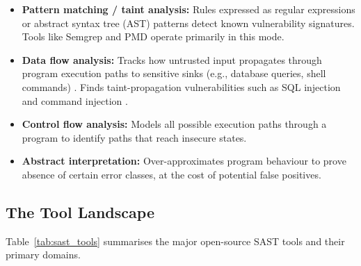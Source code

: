 \begin{itemize}
  \item \textbf{Pattern matching / taint analysis:} Rules expressed as regular expressions or abstract syntax tree (AST) patterns detect known vulnerability signatures. Tools like Semgrep and PMD operate primarily in this mode.

  \item \textbf{Data flow analysis:} Tracks how untrusted input propagates through program execution paths to sensitive sinks (e.g., database queries, shell commands) \cite{newsome2005dynamic,enck2014taintdroid}. Finds taint-propagation vulnerabilities such as SQL injection and command injection \cite{halfond2006classification}.

  \item \textbf{Control flow analysis:} Models all possible execution paths through a program to identify paths that reach insecure states.

  \item \textbf{Abstract interpretation:} Over-approximates program behaviour to prove absence of certain error classes, at the cost of potential false positives.
\end{itemize}

\subsection{The Tool Landscape}
\enlargethispage{3\baselineskip}

Table~\ref{tab:sast_tools} summarises the major open-source SAST tools and their primary domains.

